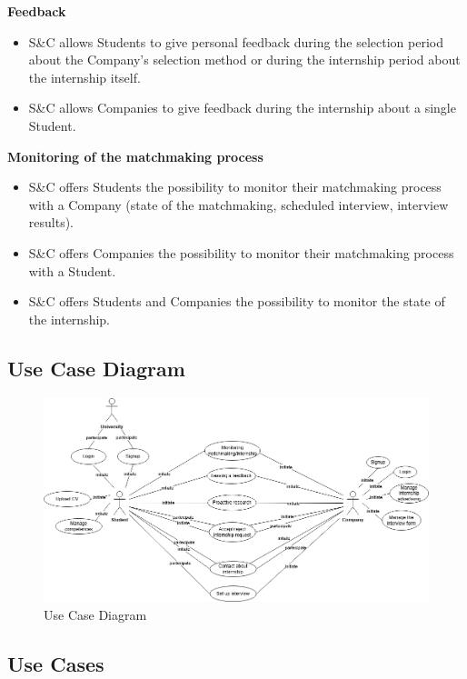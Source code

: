 \textbf{Feedback}
\begin{itemize}
    \item [\text{[R23]}] S\&C allows Students to give personal feedback during the selection period about the Company's selection method or during the internship period about the internship itself.

    \item [\text{[R24]}] S\&C allows Companies to give feedback during the internship about a single Student.
\end{itemize}

\textbf{Monitoring of the matchmaking process}
\begin{itemize}
    \item [\text{[R25]}] S\&C offers Students the possibility to monitor their matchmaking process with a Company (state of the matchmaking, scheduled interview, interview results).

    \item [\text{[R26]}] S\&C offers Companies the possibility to monitor their matchmaking process with a Student.

    \item [\text{[R27]}] S\&C offers Students and Companies the possibility to monitor the state of the internship.
\end{itemize}

\subsection{Use Case Diagram}

\begin{figure}[H]
    \centering
    \includegraphics[width=15cm]{Images/usecasediagram2.png}
    \caption{Use Case Diagram}
\end{figure}

\subsection{Use Cases}

